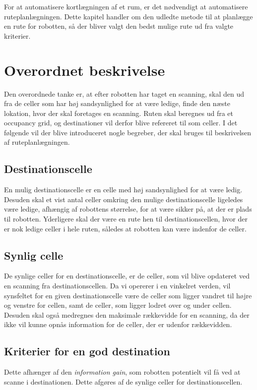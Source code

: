 \label{ruteplanleagning}
For at automatisere kortlægningen af et rum, er det nødvendigt at automatisere ruteplanlægningen.
Dette kapitel handler om den udledte metode til at planlægge en rute for robotten, så der bliver valgt den bedst mulige rute ud fra valgte kriterier.

\section{Overordnet beskrivelse}
Den overordnede tanke er, at efter robotten har taget en scanning, skal den ud fra de celler som har høj sandsynlighed for at være ledige, finde den næste lokation, hvor der skal foretages en scanning.
Ruten skal beregnes ud fra et occupancy grid, og destinationer vil derfor blive refereret til som celler.
I det følgende vil der blive introduceret nogle begreber, der skal bruges til beskrivelsen af ruteplanlægningen.

\subsection{Destinationscelle}\label{rute:destinationscelle}
En mulig destinationscelle er en celle med høj sandsynlighed for at være ledig.
Desuden skal et vist antal celler omkring den mulige destinationscelle ligeledes være ledige, afhængig af robottens størrelse, for at være sikker på, at der er plads til robotten.
Yderligere skal der være en rute hen til destinationscellen, hvor der er nok ledige celler i hele ruten, således at robotten kan være indenfor de celler.

\subsection{Synlig celle}\label{rute:synligcelle}
De synlige celler for en destinationscelle, er de celler, som vil blive opdateret ved en scanning fra destinationscellen.
Da vi opererer i en vinkelret verden, vil synsfeltet for en given destinationscelle være de celler som ligger vandret til højre og venstre for cellen, samt de celler, som ligger lodret over og under cellen.
Desuden skal også medregnes den maksimale rækkevidde for en scanning, da der ikke vil kunne opnås information for de celler, der er udenfor rækkevidden.

\subsection{Kriterier for en god destination}
Dette afhænger af den \textit{information gain}, som robotten potentielt vil få ved at scanne i destinationen.
Dette afgøres af de synlige celler for destinationscellen.

